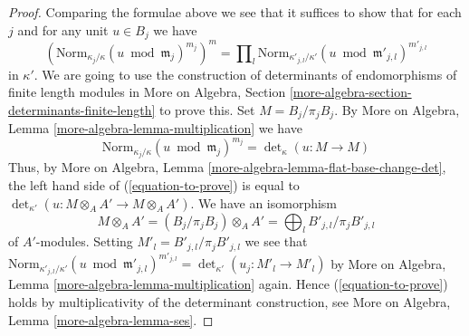 \documentclass[10pt,a4paper]{amsart}
\theoremstyle{plain}
\theoremstyle{definition}
\theoremstyle{remark}
\numberwithin{equation}{subsection}
\begin{document}
\begin{proof}
\medskip\noindent
Comparing the formulae above we see that it suffices to show that
for each $j$ and for any unit $u \in B_j$ we have
\begin{equation}
\label{equation-to-prove}
\left(\text{Norm}_{\kappa_j/\kappa}(u \bmod \mathfrak m_j)^{m_j}\right)^m
=
\prod\nolimits_l
\text{Norm}_{\kappa'_{j, l}/\kappa'}(u \bmod \mathfrak m'_{j, l})^{m'_{j, l}}
\end{equation}
in $\kappa'$. We are going to use the construction of determinants of
endomorphisms of finite length modules in
More on Algebra, Section \ref{more-algebra-section-determinants-finite-length}
to prove this. Set $M = B_j/\pi_j B_j$. By
More on Algebra, Lemma \ref{more-algebra-lemma-multiplication} we have
$$
\text{Norm}_{\kappa_j/\kappa}(u \bmod \mathfrak m_j)^{m_j} =
\det\nolimits_\kappa(u : M \to M)
$$
Thus, by
More on Algebra, Lemma \ref{more-algebra-lemma-flat-base-change-det},
the left hand side of (\ref{equation-to-prove}) is equal to
$\det_{\kappa'}(u : M \otimes_A A' \to M \otimes_A A')$.
We have an isomorphism
$$
M \otimes_A A' = (B_j/\pi_j B_j) \otimes_A A' =
\bigoplus\nolimits_l B'_{j, l}/\pi_j B'_{j, l}
$$
of $A'$-modules. Setting $M'_l = B'_{j, l}/\pi_j B'_{j, l}$ we see that
$\text{Norm}_{\kappa'_{j, l}/\kappa'}(u \bmod \mathfrak m'_{j, l})^{m'_{j, l}}
= \det_{\kappa'}(u_j : M'_l \to M'_l)$ by
More on Algebra, Lemma \ref{more-algebra-lemma-multiplication} again.
Hence (\ref{equation-to-prove}) holds by multiplicativity of the determinant
construction, see More on Algebra, Lemma \ref{more-algebra-lemma-ses}.
\end{proof}
\end{document}
